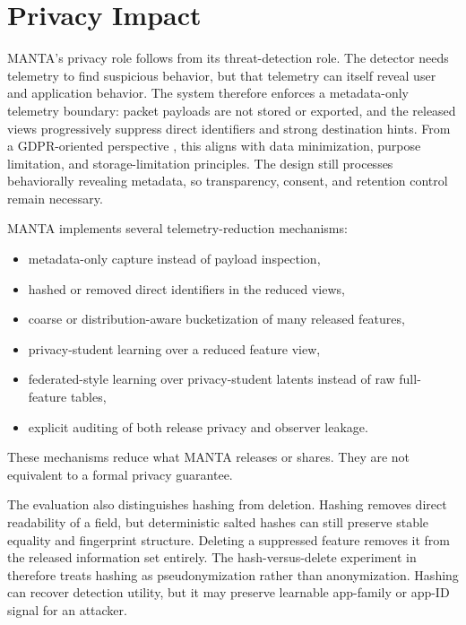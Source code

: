 \section{Privacy Impact}
MANTA's privacy role follows from its threat-detection role. The detector needs telemetry to find
suspicious behavior, but that telemetry can itself reveal user and application behavior. The system
therefore enforces a metadata-only telemetry boundary: packet payloads are not stored or exported,
and the released views progressively suppress direct identifiers and strong destination hints. From
a GDPR-oriented perspective \citep{gdpr_2016_679}, this aligns with data minimization, purpose
limitation, and storage-limitation principles. The design still processes behaviorally revealing
metadata, so transparency, consent, and retention control remain necessary.

MANTA implements several telemetry-reduction mechanisms:
\begin{itemize}[leftmargin=*]
  \item metadata-only capture instead of payload inspection,
  \item hashed or removed direct identifiers in the reduced views,
  \item coarse or distribution-aware bucketization of many released features,
  \item privacy-student learning over a reduced feature view,
  \item federated-style learning over privacy-student latents instead of raw full-feature tables,
  \item explicit auditing of both release privacy and observer leakage.
\end{itemize}

These mechanisms reduce what MANTA releases or shares. They are not equivalent to a formal privacy
guarantee.

The evaluation also distinguishes hashing from deletion. Hashing removes direct readability of a
field, but deterministic salted hashes can still preserve stable equality and fingerprint
structure. Deleting a suppressed feature removes it from the released information set entirely. The
hash-versus-delete experiment in  therefore treats hashing as
pseudonymization rather than anonymization. Hashing can recover detection utility, but it may
preserve learnable app-family or app-ID signal for an attacker.

